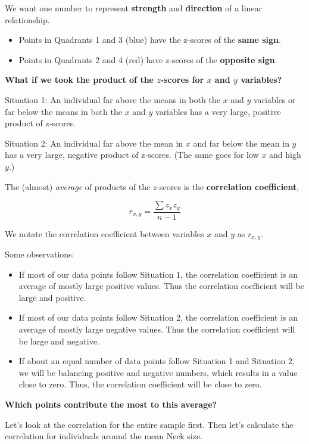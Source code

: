 \documentclass[
]{book}
\providecommand{\tightlist}{%
  \setlength{\itemsep}{0pt}\setlength{\parskip}{0pt}}
\begin{document}
We want one number to represent \textbf{strength} and \textbf{direction} of a linear relationship.

\begin{itemize}
\tightlist
\item
  Points in Quadrants 1 and 3 (blue) have the z-scores of the \textbf{same sign}.
\item
  Points in Quadrants 2 and 4 (red) have z-scores of the \textbf{opposite sign}.
\end{itemize}

\textbf{What if we took the product of the \(z\)-scores for \(x\) and \(y\) variables?}

Situation 1: An individual far above the means in both the \(x\) and \(y\) variables or far below the means in both the \(x\) and \(y\) variables has a very large, positive product of z-scores.

Situation 2: An individual far above the mean in \(x\) and far below the mean in \(y\) has a very large, negative product of z-scores. (The same goes for low \(x\) and high \(y\).)

The (almost) \emph{average} of products of the \(z\)-scores is the \textbf{correlation coefficient},

\[ r_{x,y} = \frac{\sum z_x z_y}{n-1} \]

We notate the correlation coefficient between variables \(x\) and \(y\) as \(r_{x,y}\).

Some observations:

\begin{itemize}
\tightlist
\item
  If most of our data points follow Situation 1, the correlation coefficient is an average of mostly large positive values. Thus the correlation coefficient will be large and positive.
\item
  If most of our data points follow Situation 2, the correlation coefficient is an average of mostly large negative values. Thus the correlation coefficient will be large and negative.
\item
  If about an equal number of data points follow Situation 1 and Situation 2, we will be balancing positive and negative numbers, which results in a value close to zero. Thus, the correlation coefficient will be close to zero.
\end{itemize}

\textbf{Which points contribute the most to this average?}

Let's look at the correlation for the entire sample first. Then let's calculate the correlation for individuals around the mean Neck size.
\end{document}

